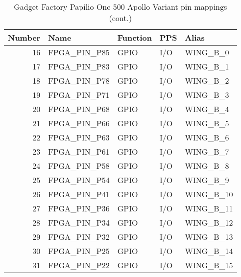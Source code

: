 \documentclass[12pt,a4paper,openany,smallheadings,headinclude,headsepline,final]{scrreprt}
\def \board {Gadget Factory Papilio One 500 Apollo Variant }
\begin{document}
\begin{table}[H]
\begin{center}
\begin{tabularx}{14cm}{rlllX}
Number & Name & Function & PPS & Alias \\
\hline
16 &FPGA\_PIN\_P85 & GPIO & I/O & WING\_B\_0 \\
17 &FPGA\_PIN\_P83 & GPIO & I/O & WING\_B\_1 \\
18 &FPGA\_PIN\_P78 & GPIO & I/O & WING\_B\_2 \\
19 &FPGA\_PIN\_P71 & GPIO & I/O & WING\_B\_3 \\
20 &FPGA\_PIN\_P68 & GPIO & I/O & WING\_B\_4 \\
21 &FPGA\_PIN\_P66 & GPIO & I/O & WING\_B\_5 \\
22 &FPGA\_PIN\_P63 & GPIO & I/O & WING\_B\_6 \\
23 &FPGA\_PIN\_P61 & GPIO & I/O & WING\_B\_7 \\
24 &FPGA\_PIN\_P58 & GPIO & I/O & WING\_B\_8 \\
25 &FPGA\_PIN\_P54 & GPIO & I/O & WING\_B\_9 \\
26 &FPGA\_PIN\_P41 & GPIO & I/O & WING\_B\_10 \\
27 &FPGA\_PIN\_P36 & GPIO & I/O & WING\_B\_11 \\
28 &FPGA\_PIN\_P34 & GPIO & I/O & WING\_B\_12 \\
29 &FPGA\_PIN\_P32 & GPIO & I/O & WING\_B\_13 \\
30 &FPGA\_PIN\_P25 & GPIO & I/O & WING\_B\_14 \\
31 &FPGA\_PIN\_P22 & GPIO & I/O & WING\_B\_15
\end{tabularx}
\caption{\board pin mappings (cont.)}
\end{center}
\end{table}
\end{document}
